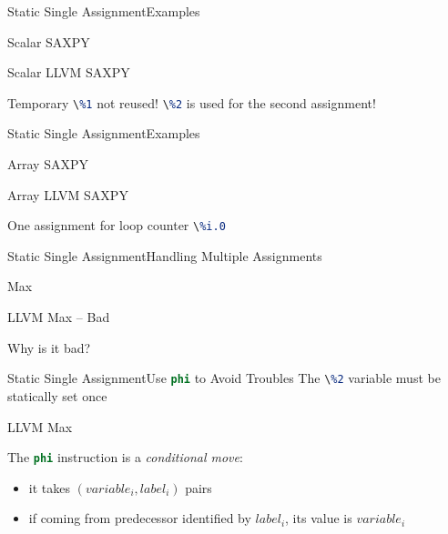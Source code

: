 \documentclass[10pt,mathserif]{beamer}
\newcommand{\cinput}[1]{}
\newcommand{\llvminput}[1]{}
\newcommand{\llvminline}[1]{\lstinline[language=LLVM]!#1!}
\begin{document}
\begin{frame}{Static Single Assignment}{Examples}
\begin{block}{Scalar SAXPY}
\centering
\cinput{snippet/02/scalar-saxpy.c}
\end{block}

\begin{block}{Scalar LLVM SAXPY}
\centering
\llvminput{snippet/02/scalar-saxpy.ll}
\end{block}

Temporary \llvminline{\%1} not reused! \llvminline{\%2} is used for the second
assignment!
\end{frame}

\begin{frame}{Static Single Assignment}{Examples}
\begin{block}{Array SAXPY}
\centering
\cinput{snippet/02/array-saxpy.c}
\end{block}

\begin{block}{Array LLVM SAXPY}
\centering
\llvminput{snippet/02/array-saxpy.ll}
\end{block}

One assignment for loop counter \llvminline{\%i.0}
\end{frame}

\begin{frame}{Static Single Assignment}{Handling Multiple Assignments}
\begin{block}{Max}
\centering
\cinput{snippet/02/max.c}
\end{block}

\begin{block}{LLVM Max -- Bad}
\centering
\llvminput{snippet/02/bad-max.ll}
\end{block}

Why is it bad?
\end{frame}

\begin{frame}{Static Single Assignment}{Use \llvminline{phi} to Avoid Troubles}
The \llvminline{\%2} variable must be statically set once

\begin{block}{LLVM Max}
\centering
\llvminput{snippet/02/good-max.ll}
\end{block}

The \llvminline{phi} instruction is a \emph{conditional move}:

\begin{itemize}
\item it takes $(variable_i, label_i)$ pairs
\item if coming from predecessor identified by $label_i$, its value is $variable_i$
\end{itemize}
\end{frame}
\end{document}
